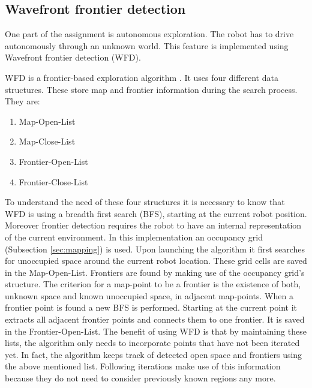 \documentclass{ba-kecs}
\begin{document}
\subsection{Wavefront frontier detection}
\label{sec:wfd}
One part of the assignment is autonomous exploration. The robot has to drive autonomously through an unknown world. This feature is implemented using Wavefront frontier detection (WFD).

WFD is a frontier-based exploration algorithm \citep{Keidar}. It uses four different data structures. These store map and frontier information during the search process. They are:
\begin{enumerate}
\item{Map-Open-List}
\item{Map-Close-List}
\item{Frontier-Open-List}
\item{Frontier-Close-List}
\end{enumerate}
To understand the need of these four structures it is necessary to know that WFD is using a breadth first search (BFS), starting at the current robot position. Moreover frontier detection requires the robot to have an internal representation of the current environment. In this implementation an occupancy grid (Subsection \ref{sec:mapping}) is used.
Upon launching the algorithm it first searches for unoccupied space around the current robot location. These grid cells are saved in the Map-Open-List. 
Frontiers are found by making use of the occupancy grid's structure. The criterion for a map-point to be a frontier is the existence of both, unknown space and known unoccupied space, in adjacent map-points. When a frontier point is found a new BFS is performed. Starting at the current point it extracts all adjacent frontier points and connects them to one frontier. It is saved in the Frontier-Open-List. The benefit of using WFD is that by maintaining these lists, the algorithm only needs to incorporate points that have not been iterated yet. In fact, the algorithm keeps track of detected open space and frontiers using the above mentioned list. Following iterations make use of this information because they do not need to consider previously known regions any more.
 
\end{document}
